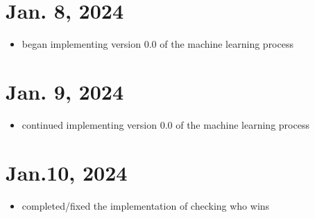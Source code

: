 \documentclass{article}
\begin{document}
\section{Jan. 8, 2024}
\begin{itemize}
    \item began implementing version 0.0 of the machine
learning process
\end{itemize}

\section{Jan. 9, 2024}
\begin{itemize}
    \item continued implementing version 0.0 of the machine
learning process
\end{itemize}

\section{Jan.10, 2024}
\begin{itemize}
    \item completed/fixed the implementation of checking who wins 
\end{itemize}
\end{document}
